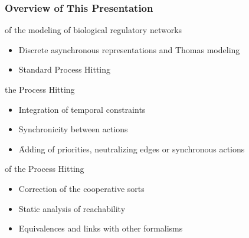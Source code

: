 \begin{frame}[c]
\frametitle{Overview of This Presentation}

 of the modeling of biological regulatory networks
\begin{itemize}
  \item Discrete asynchronous representations and Thomas modeling
  \item Standard Process Hitting
\end{itemize}

\pause
\bigskip
{} the Process Hitting
\begin{itemize}
  \item Integration of temporal constraints
  \item Synchronicity between actions
  \item[] \quad \f Adding of priorities, neutralizing edges or synchronous actions
\end{itemize}

\pause
\bigskip
{} of the Process Hitting
\begin{itemize}
  \item Correction of the cooperative sorts
  \item Static analysis of reachability
  \item Equivalences and links with other formalisms
\end{itemize}

\end{frame}
